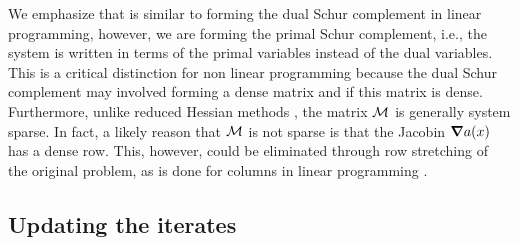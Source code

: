 \documentclass{article}
\begin{document}
We emphasize that is similar to forming the dual Schur complement in linear programming, however, we are forming the primal Schur complement, i.e., the system is written in terms of the primal variables instead of the dual variables. This is a critical distinction for non linear programming because the dual Schur complement may involved forming a dense matrix and if this matrix is dense. Furthermore, unlike reduced Hessian methods  \cite{walterThesis1,walterThesis2}, the matrix $\mathcal{M}$ is generally system sparse. In fact, a likely reason that $\mathcal{M}$ is not sparse is that the Jacobin $\grad a(x)$ has a dense row. This, however, could be eliminated through row stretching of the original problem, as is done for columns in linear programming \cite{grcar2012matrix,vanderbei1991splitting,lustig1991formulating}. 











%


\subsection{Updating the iterates}
\end{document}
